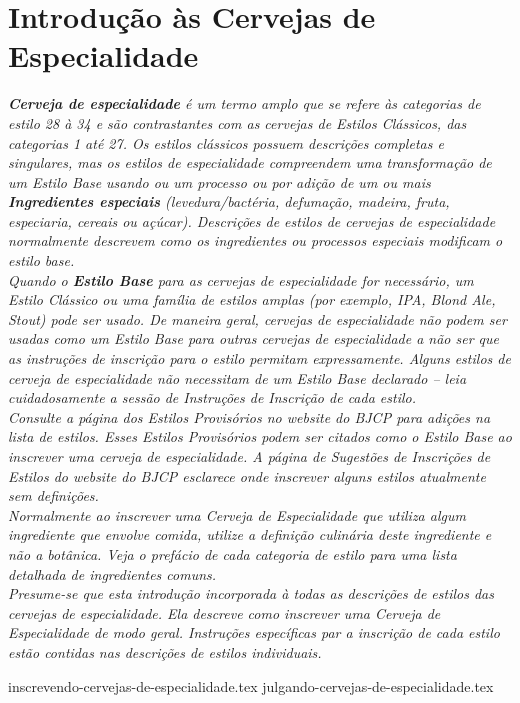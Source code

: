 \clearpage
{}
\divisorLine
\section*{Introdução às Cervejas de Especialidade}
\textit{\textbf{Cerveja de especialidade} é um termo amplo que se refere às categorias de estilo 28 à 34 e são contrastantes com as cervejas de Estilos Clássicos, das categorias 1 até 27. Os estilos clássicos possuem descrições completas e singulares, mas os estilos de especialidade compreendem uma transformação de um Estilo Base usando ou um processo ou por adição de um ou mais \textbf{Ingredientes especiais} (levedura/bactéria, defumação, madeira, fruta, especiaria, cereais ou açúcar). Descrições de estilos de cervejas de especialidade normalmente descrevem como os ingredientes ou processos especiais modificam o estilo base.}\\
\textit{Quando o \textbf{Estilo Base} para as cervejas de especialidade for necessário, um Estilo Clássico ou uma família de estilos amplas (por exemplo, IPA, Blond Ale, Stout) pode ser usado. De maneira geral, cervejas de especialidade não podem ser usadas como um Estilo Base para outras cervejas de especialidade a não ser que as instruções de inscrição para o estilo permitam expressamente. Alguns estilos de cerveja de especialidade não necessitam de um Estilo Base declarado – leia cuidadosamente a sessão de Instruções de Inscrição de cada estilo.}\\
\textit{Consulte a página dos Estilos Provisórios no website do BJCP para adições na lista de estilos. Esses Estilos Provisórios podem ser citados como o Estilo Base ao inscrever uma cerveja de especialidade. A página de Sugestões de Inscrições de Estilos do website do BJCP esclarece onde inscrever alguns estilos atualmente sem definições.}\\
\textit{Normalmente ao inscrever uma Cerveja de Especialidade que utiliza algum ingrediente que envolve comida, utilize a definição culinária deste ingrediente e não a botânica. Veja o prefácio de cada categoria de estilo para uma lista detalhada de ingredientes comuns. }\\
\textit{Presume-se que esta introdução incorporada à todas as descrições de estilos das cervejas de especialidade. Ela descreve como inscrever uma Cerveja de Especialidade de modo geral. Instruções específicas par a inscrição de cada estilo estão contidas nas descrições de estilos individuais.}\\
\begin{multicols*}{2}
{inscrevendo-cervejas-de-especialidade.tex}
{julgando-cervejas-de-especialidade.tex}
\end{multicols*}